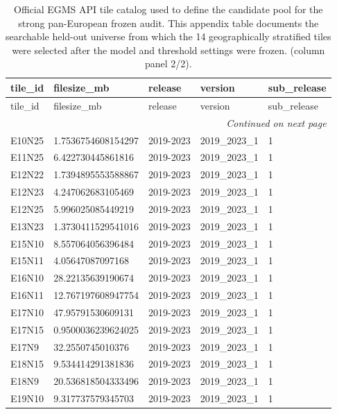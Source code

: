 \begin{landscape}
\scriptsize
\setlength{\LTleft}{0pt}
\setlength{\LTright}{0pt}
\begin{longtable}{lllll}
\caption{Official EGMS API tile catalog used to define the candidate pool for the strong pan-European frozen audit. This appendix table documents the searchable held-out universe from which the 14 geographically stratified tiles were selected after the model and threshold settings were frozen. (column panel 2/2).}\label{tab:e7_strong_api_catalog_part2}\\
\toprule
tile\_id & filesize\_mb & release & version & sub\_release \\
\midrule
\endfirsthead
\toprule
tile\_id & filesize\_mb & release & version & sub\_release \\
\midrule
\endhead
\midrule
\multicolumn{5}{r}{\textit{Continued on next page}} \\
\endfoot
\bottomrule
\endlastfoot
E10N25 & 1.7536754608154297 & 2019-2023 & 2019\_2023\_1 & 1 \\
E11N25 & 6.422730445861816 & 2019-2023 & 2019\_2023\_1 & 1 \\
E12N22 & 1.7394895553588867 & 2019-2023 & 2019\_2023\_1 & 1 \\
E12N23 & 4.247062683105469 & 2019-2023 & 2019\_2023\_1 & 1 \\
E12N25 & 5.996025085449219 & 2019-2023 & 2019\_2023\_1 & 1 \\
E13N23 & 1.3730411529541016 & 2019-2023 & 2019\_2023\_1 & 1 \\
E15N10 & 8.557064056396484 & 2019-2023 & 2019\_2023\_1 & 1 \\
E15N11 & 4.05647087097168 & 2019-2023 & 2019\_2023\_1 & 1 \\
E16N10 & 28.22135639190674 & 2019-2023 & 2019\_2023\_1 & 1 \\
E16N11 & 12.767197608947754 & 2019-2023 & 2019\_2023\_1 & 1 \\
E17N10 & 47.95791530609131 & 2019-2023 & 2019\_2023\_1 & 1 \\
E17N15 & 0.9500036239624025 & 2019-2023 & 2019\_2023\_1 & 1 \\
E17N9 & 32.2550745010376 & 2019-2023 & 2019\_2023\_1 & 1 \\
E18N15 & 9.534414291381836 & 2019-2023 & 2019\_2023\_1 & 1 \\
E18N9 & 20.536818504333496 & 2019-2023 & 2019\_2023\_1 & 1 \\
E19N10 & 9.317737579345703 & 2019-2023 & 2019\_2023\_1 & 1 \\

\end{longtable}
\end{landscape}
